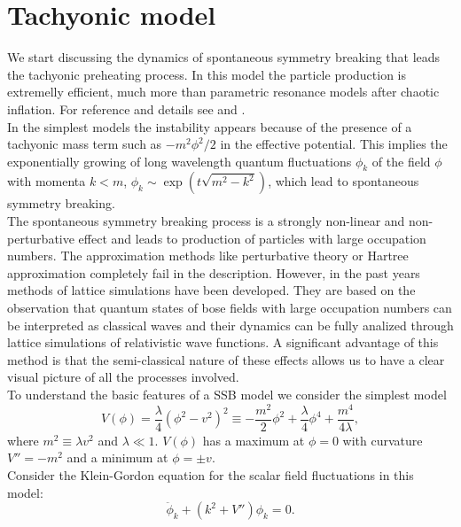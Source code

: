 \documentclass[11pt,a4paper,twoside]{book}
\begin{document}
\section{Tachyonic model}
We start discussing the dynamics of spontaneous symmetry breaking that leads the tachyonic preheating process. In this model the particle production is extremelly efficient, much more than  parametric resonance models after chaotic inflation. For reference and details see \cite{Chap5:DynamicsSymmetryBreaking} and \cite{Chap5:TachyonicInstability}.\\
In the simplest models the instability appears because of the presence of a tachyonic mass term such as $ -m^{2}\phi^{2}/2 $ in the effective potential. This implies the exponentially growing of long wavelength quantum fluctuations $\phi_{k}$ of the field $\phi$ with momenta $ k < m $, $\phi_{k} \sim \exp(t\sqrt{m^{2}-k^{2}})$, which lead to spontaneous symmetry breaking.\\ 
The spontaneous symmetry breaking process is a strongly non-linear and non-perturbative effect and leads to  production of particles with large occupation numbers. The approximation methods like perturbative theory or Hartree approximation completely fail in the description. However, in the past years  methods of lattice simulations have been developed. They are based on the observation that quantum states of bose fields with large occupation numbers can be interpreted as classical waves and their dynamics can be fully analized through lattice simulations of relativistic wave functions. A significant advantage of this method is that the semi-classical nature of these effects allows us to have a clear visual picture of all the processes involved.\\
To understand the basic features of a SSB model we consider the simplest model 
\begin{equation}
	\label{Chap5:TachyonicModel}
V(\phi)=\frac{\lambda}{4}(\phi^{2}-v^{2})^{2} \equiv -\frac{m^{2}}{2}\phi^{2} + \frac{\lambda}{4}\phi^{4} + \frac{m^{4}}{4\lambda},
\end{equation} 
where $ m^{2}\equiv \lambda v^{2} $ and $\lambda \ll 1$. $ V(\phi) $ has a maximum at $ \phi=0 $ with curvature $ V''=-m^{2} $ and a minimum at $\phi=\pm v$.\\
Consider the Klein-Gordon equation for the scalar field fluctuations in this model:
\begin{equation}
\label{Chap5:TachyonicModel_KGEquation}
\ddot{\phi}_{k} + (k^{2} + V'')\phi_{k}=0.
\end{equation}
\end{document}
